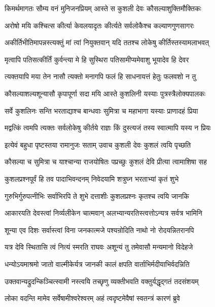 \twolineshloka
{किमर्थमागतः सौम्य वनं मुनिजनप्रियम्}
{आस्ते स कुशली देवः कौसल्याशुक्तिमौक्तिकः}%

\twolineshloka
{अरोषो मयि कश्चित्स कीर्त्या केवलयादृतः}
{कीर्त्यते सर्वलोकैश्च कल्याणगुणसागरः}%

\twolineshloka
{अकीर्तिभीतिमापन्नस्त्यक्तुं मां त्वां नियुक्तवान्}
{यदि ततश्च लोकेषु कीर्तिस्तस्यामलाभवत्}%

\twolineshloka
{मृत्वापि पतिसत्कीर्तिं कुर्वन्त्या मे हि सुस्थिरा}
{पतिसामीप्यमेवाशु भूयादेव हि देवर}%

\twolineshloka
{त्यक्तयापि मया तेन नासौ त्यक्तो मनागपि}
{फलं हि साधनायत्तं हेतुः फलवशो न तु}%

\twolineshloka
{कौसल्याशल्यशून्यासौ कृपापूर्णा सदा मयि}
{आस्ते कुशलिनी यस्याः पुत्रस्त्रैलोक्यपालकः}%

\twolineshloka
{सर्वे कुशलिनः सन्ति भरताद्याश्च बान्धवाः}
{सुमित्रा च महाभागा यस्याः प्राणादहं प्रिया}%

\twolineshloka
{मद्वत्किं त्वमपि त्यक्तः सर्वलोकेषु कीर्तये}
{राज्ञः किं दुस्त्यजं तस्य स्वात्मापि यस्य न प्रियः}%

\twolineshloka
{इत्येवं बहुधा पृष्टस्तया रामानुजः सताम्}
{उवाच कुशली देवः कुशलं त्वयि पृच्छति}%

\twolineshloka
{कौसल्या च सुमित्रा च याश्चान्या राजयोषितः}
{पप्रच्छुः कुशलं देवि प्रीत्या त्वामाशिषा सह}%

\twolineshloka
{कुशलप्रश्नपूर्वं हि तव पादाभिवन्दनम्}
{निवेदयामि शत्रुघ्न भरताभ्यां कृतं शुभे}%

\twolineshloka
{गुरुभिर्गुरुपत्नीभिः सर्वाभिरपि ते शुभे}
{दत्ताशीः कुशलप्रश्नः कृतश्च त्वयि जानकि}%

\twolineshloka
{आकारयति देवस्त्वां निर्व्यलीकेन चात्मवान्}
{अलभ्यान्यरतिस्त्वत्तोऽन्यत्र सर्वत्र भामिनि}%

\twolineshloka
{शून्या एव दिशः सर्वास्त्वां विना जनकात्मजे}
{पश्यन्रोदिति नाथो नो रोदयन्नितरानपि}%

\twolineshloka
{यत्र देवि स्थितासि त्वं नित्यं स्मरति राघवः}
{अशून्यं तु तमेवासौ मन्यमानो विदेहजे}%

\twolineshloka
{धन्योऽयमाश्रमो जातो वाल्मीकेर्यत्र जानकी}
{कालं क्षपति वार्ताभिर्मदीयाभिर्वदन्निति}%

\twolineshloka
{उक्तवान्यद्रुदन्किञ्चित्स्वामी नस्त्वयि तच्छृणु}
{व्यक्तीभवति वक्तुर्यद्धृद्गतं तदसंशयम्}%

\twolineshloka
{लोका वदन्ति मामेव सर्वेषामीश्वरेश्वरम्}
{अहं त्वदृष्टमेवैषां स्वतन्त्रं कारणं ब्रुवे}%

